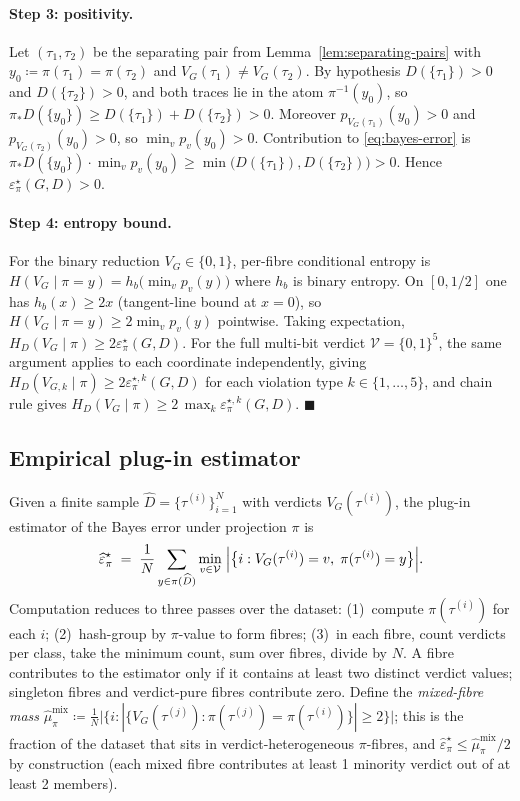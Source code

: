 \paragraph{Step 3: positivity.}
Let $(\tau_1,\tau_2)$ be the separating pair from Lemma~\ref{lem:separating-pairs}
with $y_0\coloneqq\pi(\tau_1)=\pi(\tau_2)$ and
$V_G(\tau_1)\neq V_G(\tau_2)$. By hypothesis
$D(\{\tau_1\})>0$ and $D(\{\tau_2\})>0$, and both traces lie in the
atom $\pi^{-1}(y_0)$, so
$\pi_\ast D(\{y_0\})\geq D(\{\tau_1\})+D(\{\tau_2\})>0$. Moreover
$p_{V_G(\tau_1)}(y_0)>0$ and $p_{V_G(\tau_2)}(y_0)>0$, so
$\min_v p_v(y_0)>0$. Contribution to \eqref{eq:bayes-error} is
$\pi_\ast D(\{y_0\})\cdot \min_v p_v(y_0)\geq
\min\!\bigl(D(\{\tau_1\}),D(\{\tau_2\})\bigr)>0$.
Hence $\varepsilon^{\star}_{\pi}(G,D)>0$.

\paragraph{Step 4: entropy bound.}
For the binary reduction $V_G\in\{0,1\}$, per-fibre conditional entropy
is $H(V_G\mid \pi=y)=h_b\!\bigl(\min_v p_v(y)\bigr)$ where $h_b$ is
binary entropy. On $[0,1/2]$ one has $h_b(x)\geq 2x$ (tangent-line
bound at $x=0$), so
$H(V_G\mid \pi=y)\geq 2\min_v p_v(y)$ pointwise. Taking expectation,
$H_D(V_G\mid \pi)\geq 2\varepsilon^{\star}_{\pi}(G,D)$.
For the full multi-bit verdict $\mathcal{V}=\{0,1\}^5$, the same argument
applies to each coordinate independently, giving
$H_D(V_{G,k}\mid \pi)\geq 2\varepsilon^{\star,k}_{\pi}(G,D)$ for each
violation type $k\in\{1,\ldots,5\}$, and chain rule gives
$H_D(V_G\mid \pi)\geq 2\,\max_k \varepsilon^{\star,k}_{\pi}(G,D)$. \hfill $\blacksquare$

\subsection{Empirical plug-in estimator}
\label{app:thm-empirical}

Given a finite sample $\widehat{D}=\{\tau^{(i)}\}_{i=1}^{N}$ with
verdicts $V_G(\tau^{(i)})$, the plug-in estimator of the Bayes error
under projection $\pi$ is
\[
\widehat{\varepsilon}^{\star}_{\pi}
\;=\;
\frac{1}{N}\sum_{y\in\pi(\widehat{D})}
\min_{v\in\mathcal{V}}\;\Bigl|\bigl\{i : V_G(\tau^{(i)})=v,\;\pi(\tau^{(i)})=y\bigr\}\Bigr|.
\]
Computation reduces to three passes over the dataset:
(1)~compute $\pi(\tau^{(i)})$ for each $i$;
(2)~hash-group by $\pi$-value to form fibres;
(3)~in each fibre, count verdicts per class, take the minimum count,
sum over fibres, divide by $N$.
A fibre contributes to the estimator only if it contains at least two
distinct verdict values; singleton fibres and verdict-pure fibres
contribute zero. Define the \emph{mixed-fibre mass}
$\widehat{\mu}^{\mathrm{mix}}_{\pi}\coloneqq
\frac{1}{N}\bigl|\{i : |\{V_G(\tau^{(j)}) : \pi(\tau^{(j)})=\pi(\tau^{(i)})\}|\geq 2\}\bigr|$;
this is the fraction of the dataset that sits in verdict-heterogeneous
$\pi$-fibres, and $\widehat{\varepsilon}^{\star}_{\pi}\leq
\widehat{\mu}^{\mathrm{mix}}_{\pi}/2$ by construction (each mixed
fibre contributes at least 1 minority verdict out of at least 2
members).

